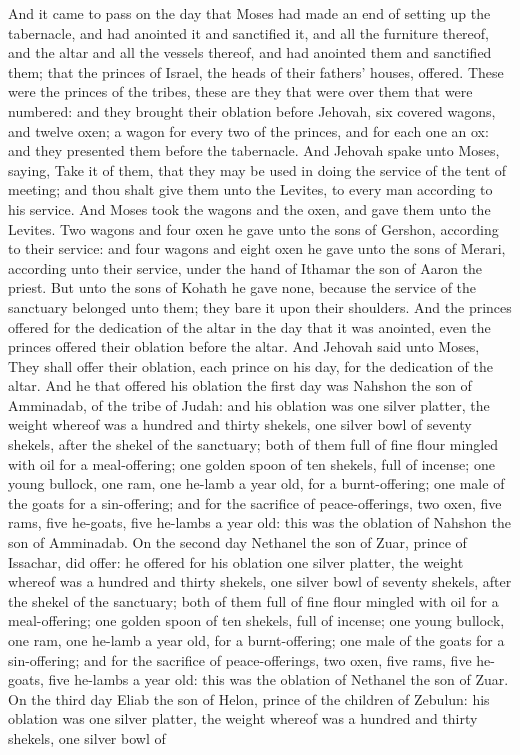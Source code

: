 And it came to pass on the day that Moses had made an end of setting up the tabernacle, and had anointed it and sanctified it, and all the furniture thereof, and the altar and all the vessels thereof, and had anointed them and sanctified them; that the princes of Israel, the heads of their fathers’ houses, offered. These were the princes of the tribes, these are they that were over them that were numbered: and they brought their oblation before Jehovah, six covered wagons, and twelve oxen; a wagon for every two of the princes, and for each one an ox: and they presented them before the tabernacle. And Jehovah spake unto Moses, saying, Take it of them, that they may be used in doing the service of the tent of meeting; and thou shalt give them unto the Levites, to every man according to his service. And Moses took the wagons and the oxen, and gave them unto the Levites. Two wagons and four oxen he gave unto the sons of Gershon, according to their service: and four wagons and eight oxen he gave unto the sons of Merari, according unto their service, under the hand of Ithamar the son of Aaron the priest. But unto the sons of Kohath he gave none, because the service of the sanctuary belonged unto them; they bare it upon their shoulders. And the princes offered for the dedication of the altar in the day that it was anointed, even the princes offered their oblation before the altar. And Jehovah said unto Moses, They shall offer their oblation, each prince on his day, for the dedication of the altar.  And he that offered his oblation the first day was Nahshon the son of Amminadab, of the tribe of Judah: and his oblation was one silver platter, the weight whereof was a hundred and thirty shekels, one silver bowl of seventy shekels, after the shekel of the sanctuary; both of them full of fine flour mingled with oil for a meal-offering; one golden spoon of ten shekels, full of incense; one young bullock, one ram, one he-lamb a year old, for a burnt-offering; one male of the goats for a sin-offering; and for the sacrifice of peace-offerings, two oxen, five rams, five he-goats, five he-lambs a year old: this was the oblation of Nahshon the son of Amminadab.  On the second day Nethanel the son of Zuar, prince of Issachar, did offer: he offered for his oblation one silver platter, the weight whereof was a hundred and thirty shekels, one silver bowl of seventy shekels, after the shekel of the sanctuary; both of them full of fine flour mingled with oil for a meal-offering; one golden spoon of ten shekels, full of incense; one young bullock, one ram, one he-lamb a year old, for a burnt-offering; one male of the goats for a sin-offering; and for the sacrifice of peace-offerings, two oxen, five rams, five he-goats, five he-lambs a year old: this was the oblation of Nethanel the son of Zuar.  On the third day Eliab the son of Helon, prince of the children of Zebulun: his oblation was one silver platter, the weight whereof was a hundred and thirty shekels, one silver bowl of 